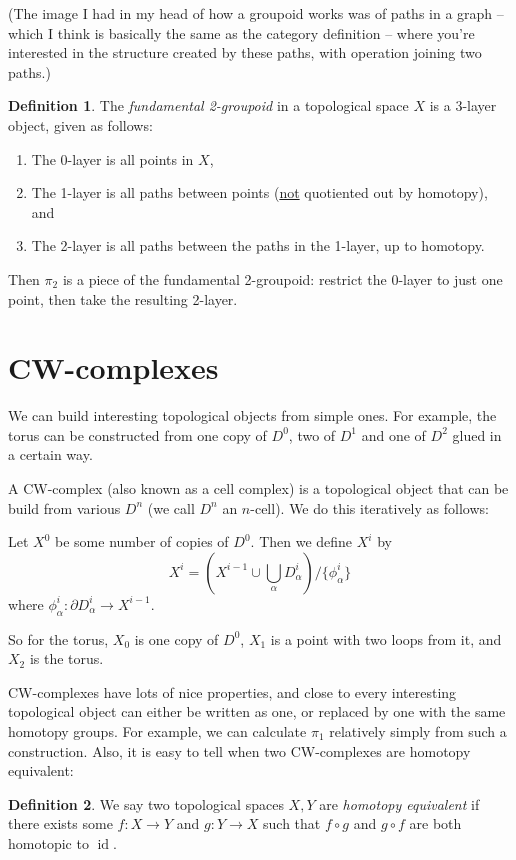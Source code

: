 \documentclass[a4paper,12pt]{article}
\newcommand{\of}{\circ}
\newcommand{\del}{\partial}
\theoremstyle{definition}
\newtheorem*{defn}{Definition}
\begin{document}
(The image I had in my head of how a groupoid works was of paths in a graph -- which I think is basically the same as the category definition -- where you're interested in the structure created by these paths, with operation joining two paths.)

\begin{defn}
The \emph{fundamental 2-groupoid} in a topological space $X$ is a 3-layer object, given as follows:
\begin{enumerate}[start=0]
\item The 0-layer is all points in $X$,
\item The 1-layer is all paths between points (\underline{not} quotiented out by homotopy), and
\item The 2-layer is all paths between the paths in the 1-layer, up to homotopy.
\end{enumerate}
\end{defn}

Then $\pi_2$ is a piece of the fundamental 2-groupoid: restrict the 0-layer to just one point, then take the resulting 2-layer.

\section{CW-complexes}

We can build interesting topological objects from simple ones.
For example, the torus can be constructed from one copy of $D^0$, two of $D^1$ and one of $D^2$ glued in a certain way.

A CW-complex (also known as a cell complex) is a topological object that can be build from various $D^n$ (we call $D^n$ an $n$-cell).
We do this iteratively as follows:

Let $X^0$ be some number of copies of $D^0$.
Then we define $X^i$ by
$$X^i = (X^{i-1}\cup \bigcup_{\alpha} D_{\alpha}^i)/\{\phi_\alpha^i\}$$
where $\phi_\alpha^i: \del D_\alpha^i\to X^{i-1}$.

So for the torus, $X_0$ is one copy of $D^0$, $X_1$ is a point with two loops from it, and $X_2$ is the torus.

CW-complexes have lots of nice properties, and close to every interesting topological object can either be written as one, or replaced by one with the same homotopy groups.
For example, we can calculate $\pi_1$ relatively simply from such a construction.
Also, it is easy to tell when two CW-complexes are homotopy equivalent:

\begin{defn}
	We say two topological spaces $X, Y$ are \emph{homotopy equivalent} if there exists some $f: X\to Y$ and $g: Y\to X$ such that $f\of g$ and $g\of f$ are both homotopic to $\operatorname{id}$.
\end{defn}
\end{document}
